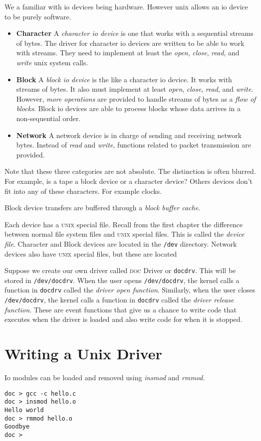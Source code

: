 We a familiar with io devices being hardware.
However unix allows an io device to be purely software. 


\begin{itemize}   
\renewcommand{\labelitemi}{$\Box$}
\item \textbf{Character} 
A \textit{character io device} is one that works with a sequential streams of bytes. 
The driver for character io devices are written to be able to work with streams.
They need to implement at least the \textit{open}, \textit{close}, \textit{read}, and 
\textit{write} unix system calls. 
\item \textbf{Block} 
A \textit{block io device} is the like a character io device. 
It works with streams of bytes. It also must implement at least \textit{open}, \textit{close}, \textit{read}, and \textit{write}. However, \textit{more operations} are provided to handle streams of bytes as a \textit{flow of blocks}. Block io devices are 
able to process blocks whose data arrives in a non-sequential order.
\item \textbf{Network} 
A network device is in charge of sending and receiving network bytes.
Instead of \textit{read} and \textit{write}, functions
related to packet transmission are provided.
\end{itemize}

Note that these three categories are not absolute. 
The distinction is often blurred. For example, is a tape a 
block device or a character device? Others devices don't fit 
into any of these characters.
For example clocks.


Block device transfers are buffered through a \textit{block buffer cache}.

Each device has a \textsc{unix} special file. 
Recall from the first chapter the difference between normal file system files 
and \textsc{unix} special files.
This is called the \textit{device file}.
Character and Block devices are located in the \lstinline{/dev} directory.
Network devices also have \textsc{unix} special files, but these are located 

Suppose we create our own driver called \textsc{doc} Driver or \lstinline{docdrv}. 
This will be stored in \lstinline{/dev/docdrv}.
When the user opens \lstinline{/dev/docdrv}, 
the kernel calls a function in \lstinline{docdrv} called the
\textit{driver open function}. Similarly, when the user closes \lstinline{/dev/docdrv}, 
the kernel calls a function in \lstinline{docdrv} called the 
\textit{driver release function}. These are event functions that give us a chance 
to write code that executes when the driver is loaded and also write code 
for when it is stopped. 



\section{Writing a Unix Driver}

Io modules can be loaded and removed using \textit{insmod} and \textit{rmmod}.

\begin{lstlisting}
doc > gcc -c hello.c
doc > insmod hello.o
Hello world
doc > rmmod hello.o
Goodbye
doc >
\end{lstlisting}